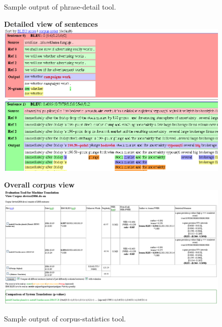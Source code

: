 \documentclass[11pt]{report}
\theoremstyle{plain}
\begin{document}
{\begin{figure}[h]
\centering
{}
\caption{Sample output of phrase-detail tool.}
\label{fig:phrases_used_screenshot}
\end{figure}

\begin{figure}
\centering
{\bf Detailed view of sentences}\\
\includegraphics[width=6in]{images/sentence-by-sentence_multiref_screenshot.png}

\vspace{5mm}
{\bf Overall corpus view}
\includegraphics[width=6in]{images/corpus_overview_screenshot_de-en.png}
\caption{Sample output of corpus-statistics tool.}
\label{fig:sentence_by_sentence_screenshot}
\end{figure}




}
\end{document}
